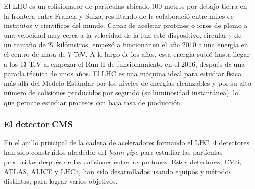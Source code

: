 \documentclass[a4paper, 10pt, openright]{report}
\begin{document}
\begin{appendices}
El \ac{LHC} es un colisionador de part\'{i}culas ubicado 100 metros por debajo tierra en la frontera entre Francia y Suiza, resultando de la colaboraci\'{o} entre miles de institutos y cient\'{i}ficos del mundo. Capaz de acelerar protones o iones de plomo a una velocidad muy cerca a la velocidad de la luz, este dispositivo, circular y de un tama\~{n}o de 27 kil\'{o}metros, empez\'{o} a funcionar en el a\~{n}o 2010 a una energ\'{i}a en el centro de masa de 7 TeV. A lo largo de los a\~{n}os, esta energ\'{i}a subi\'{o} hasta llegar a los 13 TeV al empezar el Run II de funcionamiento en el 2016, despu\'{e}s de una parada t\'{e}cnica de unos a\~{n}os. El \ac{LHC} es una m\'{a}quina ideal para estudiar f\'{i}sica m\'{a}s all\'{a} del Modelo Est\'{a}ndar por los niveles de energ\'{i}as alcanzables y por su alto n\'{u}mero de colisiones producidos por segundo (su luminosidad instant\'{a}nea), lo que permite estudiar procesos con baja tasa de producci\'{o}n.

\subsubsection{El detector CMS}

En el anillo principal de la cadena de aceleradores formando el \ac{LHC}, 4 detectores han sido construidos alrededor del \textit{beam pipe} para estudiar las part\'{i}culas producidas despu\'{e}s de las colisiones entre los protones. Estos detectores, \ac{CMS}, \ac{ATLAS}, \ac{ALICE} y LHCb, han sido desarrollados usando equipos y m\'{e}todos distintos, para lograr varios objetivos. 


\end{appendices}
\end{document}
